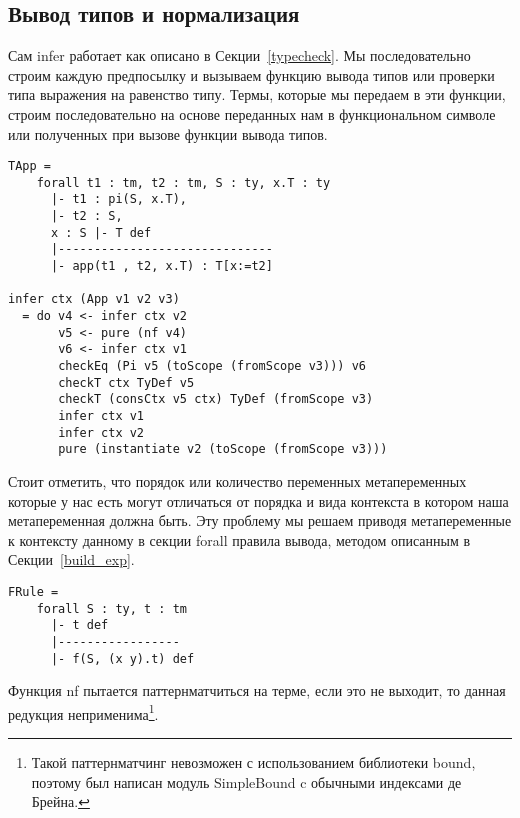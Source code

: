 \subsection{Вывод типов и нормализация}
Сам infer работает как описано в Секции~\ref{typecheck}. Мы последовательно строим каждую предпосылку и вызываем функцию вывода типов или проверки типа выражения на равенство типу. Термы, которые мы передаем в эти функции, строим последовательно на основе переданных нам в функциональном символе или полученных при вызове функции вывода типов.

\begin{lstlisting}[caption={Пример правила вывода и части сгенерированной функции infer, соответствующей этому правилу},captionpos=b]
TApp =
    forall t1 : tm, t2 : tm, S : ty, x.T : ty
      |- t1 : pi(S, x.T),
      |- t2 : S,
      x : S |- T def
      |------------------------------
      |- app(t1 , t2, x.T) : T[x:=t2]

infer ctx (App v1 v2 v3)
  = do v4 <- infer ctx v2
       v5 <- pure (nf v4)
       v6 <- infer ctx v1
       checkEq (Pi v5 (toScope (fromScope v3))) v6
       checkT ctx TyDef v5
       checkT (consCtx v5 ctx) TyDef (fromScope v3)
       infer ctx v1
       infer ctx v2
       pure (instantiate v2 (toScope (fromScope v3)))
\end{lstlisting}

Стоит отметить, что порядок или количество переменных метапеременных которые у нас есть могут отличаться от порядка и вида контекста в котором наша метапеременная должна быть. Эту проблему мы решаем приводя метапеременные к контексту данному в секции forall правила вывода, методом описанным в Секции~\ref{build_exp}.

\begin{lstlisting}[caption={Искусственный пример случая несоответствия контекстов (контекст t нужно сократить до использования в предпосылке)},captionpos=b]
FRule =
    forall S : ty, t : tm
      |- t def
      |-----------------
      |- f(S, (x y).t) def
\end{lstlisting}

Функция nf пытается паттернматчиться на терме, если это не выходит, то данная редукция неприменима\footnote{Такой паттернматчинг невозможен с использованием библиотеки bound\cite{bound}, поэтому был написан модуль SimpleBound c обычными индексами де Брейна.}.
